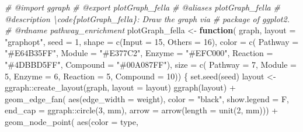 \documentclass[
]{article}
\newenvironment{Shaded}{\begin{snugshade}}{\end{snugshade}}
\newcommand{\AttributeTok}[1]{\textcolor[rgb]{0.77,0.63,0.00}{#1}}
\newcommand{\CommentTok}[1]{\textcolor[rgb]{0.56,0.35,0.01}{\textit{#1}}}
\newcommand{\ControlFlowTok}[1]{\textcolor[rgb]{0.13,0.29,0.53}{\textbf{#1}}}
\newcommand{\DecValTok}[1]{\textcolor[rgb]{0.00,0.00,0.81}{#1}}
\newcommand{\FunctionTok}[1]{\textcolor[rgb]{0.00,0.00,0.00}{#1}}
\newcommand{\NormalTok}[1]{#1}
\newcommand{\OtherTok}[1]{\textcolor[rgb]{0.56,0.35,0.01}{#1}}
\newcommand{\SpecialCharTok}[1]{\textcolor[rgb]{0.00,0.00,0.00}{#1}}
\newcommand{\StringTok}[1]{\textcolor[rgb]{0.31,0.60,0.02}{#1}}
\begin{document}
\begin{Shaded}
\begin{Highlighting}[]
\CommentTok{\#\textquotesingle{} @import ggraph}
\CommentTok{\#\textquotesingle{} @export plotGraph\_fella}
\CommentTok{\#\textquotesingle{} @aliases plotGraph\_fella}
\CommentTok{\#\textquotesingle{} @description \textbackslash{}code\{plotGraph\_fella\}: Draw the graph via}
\CommentTok{\#\textquotesingle{} package of \textquotesingle{}ggplot2\textquotesingle{}.}
\CommentTok{\#\textquotesingle{} @rdname pathway\_enrichment}
\NormalTok{plotGraph\_fella }\OtherTok{\textless{}{-}} \ControlFlowTok{function}\NormalTok{(}
\NormalTok{  graph, }\AttributeTok{layout =} \StringTok{"graphopt"}\NormalTok{, }\AttributeTok{seed =} \DecValTok{1}\NormalTok{,}
  \AttributeTok{shape =} \FunctionTok{c}\NormalTok{(}\AttributeTok{Input =} \DecValTok{15}\NormalTok{, }\AttributeTok{Others =} \DecValTok{16}\NormalTok{),}
  \AttributeTok{color =} \FunctionTok{c}\NormalTok{(}
    \AttributeTok{Pathway =} \StringTok{"\#E64B35FF"}\NormalTok{,}
    \AttributeTok{Module =} \StringTok{"\#E377C2"}\NormalTok{,}
    \AttributeTok{Enzyme =} \StringTok{"\#EFC000"}\NormalTok{,}
    \AttributeTok{Reaction =} \StringTok{"\#4DBBD5FF"}\NormalTok{,}
    \AttributeTok{Compound =} \StringTok{"\#00A087FF"}\NormalTok{),}
  \AttributeTok{size =} \FunctionTok{c}\NormalTok{(}
    \AttributeTok{Pathway =} \DecValTok{7}\NormalTok{,}
    \AttributeTok{Module =} \DecValTok{5}\NormalTok{,}
    \AttributeTok{Enzyme =} \DecValTok{6}\NormalTok{,}
    \AttributeTok{Reaction =} \DecValTok{5}\NormalTok{,}
    \AttributeTok{Compound =} \DecValTok{10}\NormalTok{))}
\NormalTok{\{}
  \FunctionTok{set.seed}\NormalTok{(seed)}
\NormalTok{  layout }\OtherTok{\textless{}{-}}\NormalTok{ ggraph}\SpecialCharTok{::}\FunctionTok{create\_layout}\NormalTok{(graph, }\AttributeTok{layout =}\NormalTok{ layout)}
  \FunctionTok{ggraph}\NormalTok{(layout) }\SpecialCharTok{+} 
    \FunctionTok{geom\_edge\_fan}\NormalTok{(}
      \FunctionTok{aes}\NormalTok{(}\AttributeTok{edge\_width =}\NormalTok{ weight),}
      \AttributeTok{color =} \StringTok{"black"}\NormalTok{,}
      \AttributeTok{show.legend =}\NormalTok{ F,}
      \AttributeTok{end\_cap =}\NormalTok{ ggraph}\SpecialCharTok{::}\FunctionTok{circle}\NormalTok{(}\DecValTok{3}\NormalTok{, }\StringTok{\textquotesingle{}mm\textquotesingle{}}\NormalTok{),}
      \AttributeTok{arrow =} \FunctionTok{arrow}\NormalTok{(}\AttributeTok{length =} \FunctionTok{unit}\NormalTok{(}\DecValTok{2}\NormalTok{, }\StringTok{\textquotesingle{}mm\textquotesingle{}}\NormalTok{))) }\SpecialCharTok{+} 
    \FunctionTok{geom\_node\_point}\NormalTok{(}
      \FunctionTok{aes}\NormalTok{(}\AttributeTok{color =}\NormalTok{ type,}

\end{Highlighting}
\end{Shaded}
\end{document}
